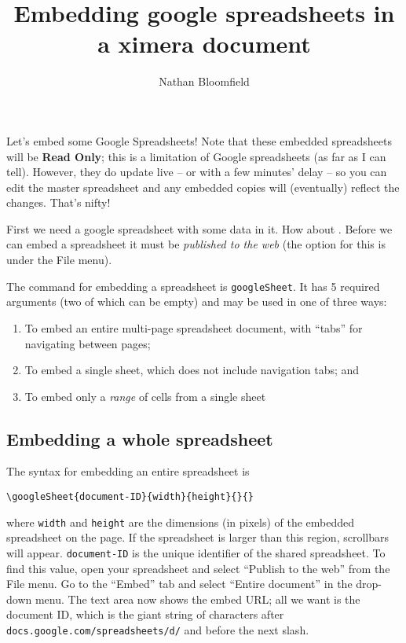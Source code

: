 \documentclass{ximera}
\title{Embedding google spreadsheets in a ximera document}
\author{Nathan Bloomfield}
\begin{document}
\maketitle

Let's embed some Google Spreadsheets! Note that these embedded spreadsheets will be \textbf{Read Only}; this is a limitation of Google spreadsheets (as far as I can tell). However, they do update live -- or with a few minutes' delay -- so you can edit the master spreadsheet and any embedded copies will (eventually) reflect the changes. That's nifty!

First we need a google spreadsheet with some data in it. How about . Before we can embed a spreadsheet it must be \textit{published to the web} (the option for this is under the File menu).

The command for embedding a spreadsheet is \texttt{googleSheet}. It has 5 required arguments (two of which can be empty) and may be used in one of three ways:
\begin{enumerate}
\item To embed an entire multi-page spreadsheet document, with ``tabs'' for navigating between pages;
\item To embed a single sheet, which does not include navigation tabs; and
\item To embed only a \textit{range} of cells from a single sheet
\end{enumerate}

\subsection{Embedding a whole spreadsheet}

The syntax for embedding an entire spreadsheet is
\begin{verbatim}
\googleSheet{document-ID}{width}{height}{}{}
\end{verbatim}
where \texttt{width} and \texttt{height} are the dimensions (in pixels) of the embedded spreadsheet on the page. If the spreadsheet is larger than this region, scrollbars will appear. \texttt{document-ID} is the unique identifier of the shared spreadsheet. To find this value, open your spreadsheet and select ``Publish to the web'' from the File menu. Go to the ``Embed'' tab and select ``Entire document'' in the drop-down menu. The text area now shows the embed URL; all we want is the document ID, which is the giant string of characters after \texttt{docs.google.com/spreadsheets/d/} and before the next slash.
\end{document}
